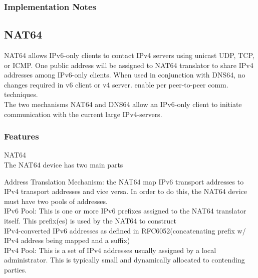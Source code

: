 \documentclass[iwp,first]{luthesis}
\begin{document}



\subsubsection {Implementation Notes}














\subsection{NAT64}


NAT64 allows IPv6-only clients to contact IPv4 servers using unicast UDP, TCP, or
ICMP. One public address will be assigned to NAT64 translator to share IPv4 addresses among IPv6-only clients.
When used in conjunction with DNS64, no changes required in v6 client or v4 server. enable per peer-to-peer comm. techniques.
\\The two mechanisms NAT64 and DNS64 allow an IPv6-only client to initiate communication with the current large IPv4-servers.

\subsubsection {Features}
NAT64
\\The NAT64 device has two main parts

Address Translation Mechanism: the NAT64 map IPv6 transport addresses to IPv4 transport addresses and vice versa. In order to do this, the
NAT64 device must have two pools of addresses.
\\IPv6 Pool: This is one or more IPv6 prefixes assigned to the NAT64 translator itself. This prefix(es) is used by the NAT64 to construct
\\IPv4-converted IPv6 addresses as defined in RFC6052(concatenating prefix w/ IPv4 address being mapped and a suffix)
\\IPv4 Pool: This is a set of IPv4 addresses usually assigned by a local administrator. This is typically small and dynamically allocated to
contending parties.
\end{document}
